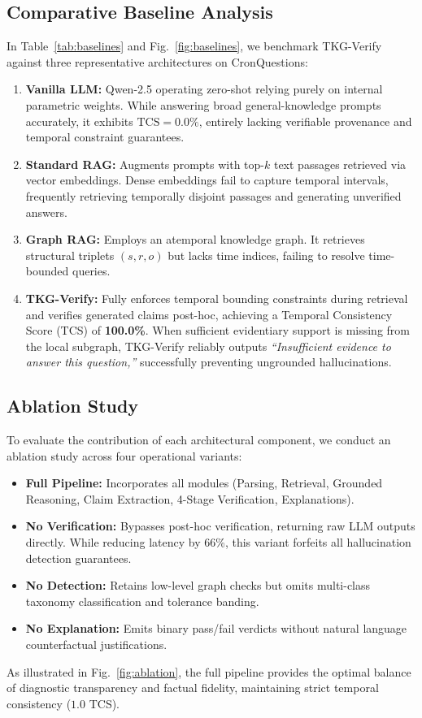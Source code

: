 \documentclass[conference]{IEEEtran}
\begin{document}
\subsection{Comparative Baseline Analysis}
In Table~\ref{tab:baselines} and Fig.~\ref{fig:baselines}, we benchmark TKG-Verify against three representative architectures on CronQuestions:
\begin{enumerate}
    \item \textbf{Vanilla LLM:} Qwen-2.5 operating zero-shot relying purely on internal parametric weights. While answering broad general-knowledge prompts accurately, it exhibits $\mathrm{TCS} = 0.0\%$, entirely lacking verifiable provenance and temporal constraint guarantees.
    \item \textbf{Standard RAG:} Augments prompts with top-$k$ text passages retrieved via vector embeddings. Dense embeddings fail to capture temporal intervals, frequently retrieving temporally disjoint passages and generating unverified answers.
    \item \textbf{Graph RAG:} Employs an atemporal knowledge graph. It retrieves structural triplets $(s, r, o)$ but lacks time indices, failing to resolve time-bounded queries.
    \item \textbf{TKG-Verify:} Fully enforces temporal bounding constraints during retrieval and verifies generated claims post-hoc, achieving a Temporal Consistency Score (TCS) of \textbf{100.0\%}. When sufficient evidentiary support is missing from the local subgraph, TKG-Verify reliably outputs \textit{``Insufficient evidence to answer this question,''} successfully preventing ungrounded hallucinations.
\end{enumerate}

\subsection{Ablation Study}
To evaluate the contribution of each architectural component, we conduct an ablation study across four operational variants:
\begin{itemize}
    \item \textbf{Full Pipeline:} Incorporates all modules (Parsing, Retrieval, Grounded Reasoning, Claim Extraction, 4-Stage Verification, Explanations).
    \item \textbf{No Verification:} Bypasses post-hoc verification, returning raw LLM outputs directly. While reducing latency by 66\%, this variant forfeits all hallucination detection guarantees.
    \item \textbf{No Detection:} Retains low-level graph checks but omits multi-class taxonomy classification and tolerance banding.
    \item \textbf{No Explanation:} Emits binary pass/fail verdicts without natural language counterfactual justifications.
\end{itemize}
As illustrated in Fig.~\ref{fig:ablation}, the full pipeline provides the optimal balance of diagnostic transparency and factual fidelity, maintaining strict temporal consistency ($1.0$ TCS).
\end{document}
